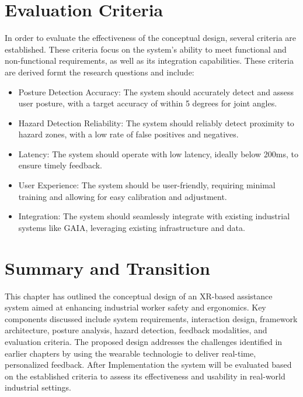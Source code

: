 \section{Evaluation Criteria}
In order to evaluate the effectiveness of the conceptual design, several criteria are established. These criteria focus on the system's ability to meet functional and non-functional requirements, as well as its integration capabilities.  
These criteria are derived formt the research questions and include:
\begin{itemize}
    \item Posture Detection Accuracy: The system should accurately detect and assess user posture, with a target accuracy of within 5 degrees for joint angles.
    \item Hazard Detection Reliability: The system should reliably detect proximity to hazard zones, with a low rate of false positives and negatives.
    \item Latency: The system should operate with low latency, ideally below 200ms, to ensure timely feedback.
    \item User Experience: The system should be user-friendly, requiring minimal training and allowing for easy calibration and adjustment.
    \item Integration: The system should seamlessly integrate with existing industrial systems like GAIA, leveraging existing infrastructure and data.
\end{itemize}

\section{Summary and Transition}
This chapter has outlined the conceptual design of an XR-based assistance system aimed at enhancing industrial worker safety and ergonomics. Key components discussed include system requirements, interaction design, framework architecture, posture analysis, hazard detection, feedback modalities, and evaluation criteria. The proposed design addresses the challenges identified in earlier chapters by using the wearable technologie to deliver real-time, personalized feedback.
After Implementation the system will be evaluated based on the established criteria to assess its effectiveness and usability in real-world industrial settings.
